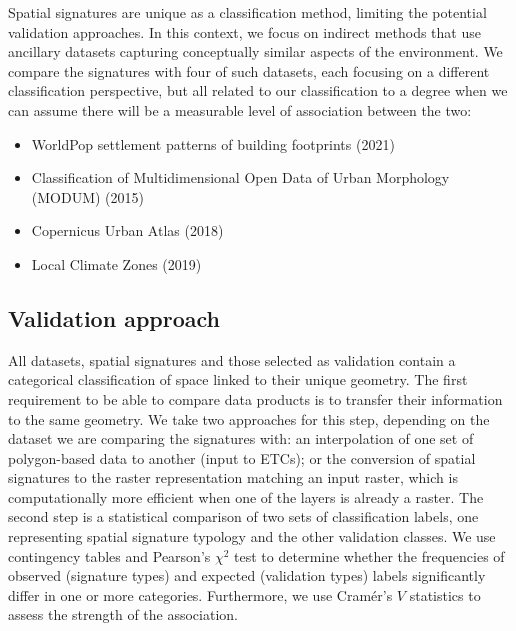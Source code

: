 Spatial signatures are unique as a classification method, limiting the potential
validation approaches. In this context, we focus on indirect methods that use ancillary datasets capturing
conceptually similar aspects of the environment. We compare the signatures with four of
such datasets, each focusing on a different classification perspective, but all related
to our classification to a degree when we can assume there will be a measurable level of
association between the two:

\begin{itemize}
    \item WorldPop settlement patterns of building footprints (2021)\cite{jochem2021tools}
    \item Classification of Multidimensional Open Data of Urban Morphology (MODUM) (2015)\cite{alexiou2016}
    \item Copernicus Urban Atlas (2018)\cite{eea2018}
    \item Local Climate Zones (2019)\cite{demuzere2019mapping}
\end{itemize}


\subsection*{Validation approach}
All datasets, spatial signatures and those selected as validation contain a
categorical classification of space linked to their unique geometry. The first
requirement to be able to compare data products is to transfer their
information to the same geometry. We take two approaches for this step,
depending on the dataset we are comparing the signatures with:
an interpolation of one set of polygon-based data to another (input to ETCs);
or the conversion of
spatial signatures to the raster representation matching an input raster,
which is computationally more efficient when one of the layers is already a raster. The second
step is a statistical comparison of two sets of classification labels, one representing
spatial signature typology and the other validation classes. We use contingency tables
and Pearson's $\chi^{2}$ test to determine whether the frequencies of observed
(signature types) and expected (validation types) labels significantly differ in one or
more categories. Furthermore, we use Cramér's $V$ statistics\cite{cramer2016mathematical} to assess the strength of
the association.

